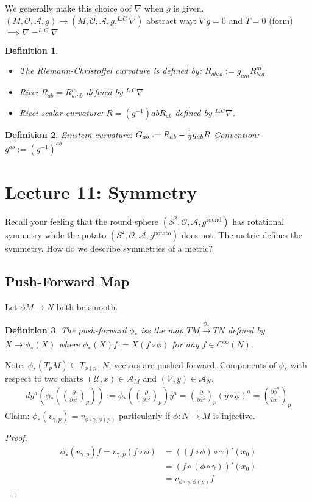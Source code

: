 \documentclass[10pt, oneside]{article}
\newtheorem{defn}{Definition}
\begin{document}
We generally make this choice oof $\nabla$ when $g$ is given. $(M, \mathcal{O},\mathcal{A},g) \to (M, \mathcal{O}, \mathcal{A}, g,^{L.C}\nabla)$ abstract way: $\nabla g =0$ and $T = 0$ (form) $\implies \nabla =^{L.C}\nabla$
\begin{defn}
  \begin{itemize}
  \item The Riemann-Christoffel curvature is defined by: $R_{abcd} := g_{am}R^m_{bcd}$
  \item Ricci $R_{ab} = R^m_{amb}$ defined by $^{L.C} \nabla$
  \item Ricci scalar curvature: $R=(g^{-1}){ab} R_{ab}$ defined by $^{L.C} \nabla$.
  \end{itemize}
\end{defn}
\begin{defn}
Einstein curvature: $G_{ab} := R_{ab} - \frac{1}{2} g_{ab} R \\$
Convention: $g^{ab} := (g^{-1})^{ab}$
\end{defn}
\section{Lecture 11: Symmetry \cite{Symmetry}}
Recall your feeling that the round sphere $(S^2,\mathcal{O},\mathcal{A},g^{\text{round}})$ has rotational symmetry while the potato $(S^2,\mathcal{O},\mathcal{A},g^{\text{potato}})$ does not.
The metric defines the symmetry. How do we describe symmetries of a metric?
\subsection{Push-Forward Map}
Let $\phi M \to N$ both be smooth.
\begin{defn}
The push-forward $\phi_*$ iss the map $TM \xrightarrow[]{\phi_*} TN$ defined by $X \to \phi_*(X)$ where $\phi_* (X) f:=
X(f \circ \phi)$ for any $f \in C^\infty (N)$.
\end{defn}
Note: $\phi_*(T_p M) \subseteq T_{\phi(p)} N$, vectors are pushed forward. Components of $\phi_*$ with respect to two charts $(\mathcal{U},x) \in \mathcal{A}_M$ and $(\mathcal{V},y)\in \mathcal{A}_N$.
\begin{align*}
  dy^a(\phi_*((\frac{\partial}{\partial x^i})_p)) := \phi_*((\frac{\partial}{\partial x^i})_p)y^a = (\frac{\partial}{\partial x^i})_p(y\circ \phi)^a = (\frac{\partial \hat{\phi}^a}{\partial x^i})_p
\end{align*}
Claim: $\phi_*(v_{\gamma, p}) = v_{\phi \circ \gamma,\phi(p)}$ particularly if $\phi: N \to M$ is injective.
\begin{proof}
\begin{align*}
  \phi_*(v_{\gamma,p})f = v_{\gamma,p} (f \circ \phi) &= ((f \circ \phi)\circ \gamma)'(x_0) \\
  &= (f \circ (\phi \circ \gamma))'(x_0)\\
  &= v_{\phi \circ \gamma,\phi(p)} f
\end{align*}
\end{proof}
\end{document}

